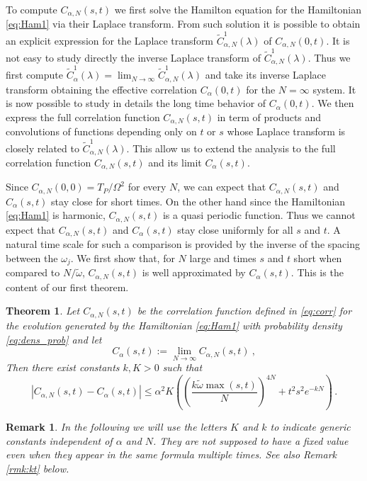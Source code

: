 \documentclass[11pt]{article}
\numberwithin{equation}{section}
\newtheorem{theo}{Theorem}
\newtheorem{rmk}[theorem]{Remark}
\numberwithin{theorem}{section}
\def\tilde#1{\widetilde{#1}}
\begin{document}
To compute $C_{\alpha,N}(s,t)$ we first solve the Hamilton equation for the Hamiltonian \eqref{eq:Ham1} via their
Laplace transform. From such solution it is possible to obtain an explicit expression for the Laplace transform $\tilde
C^1_{\alpha,N}(\lambda)$ of $C_{\alpha,N}(0,t)$. It is not easy to study directly the inverse Laplace transform of  $\tilde
C^1_{\alpha,N}(\lambda)$. Thus we first compute $\tilde C^1_{\alpha}(\lambda)=\lim_{N\to\infty}\tilde
C^1_{\alpha,N}(\lambda)$ and take its inverse Laplace transform obtaining the effective correlation $C_{\alpha}(0,t)$ for
the $N=\infty$ system. It is now possible to study in details the long time behavior of $C_{\alpha}(0,t)$.  We then
express the full correlation function $C_{\alpha,N}(s,t)$ in term of products and convolutions of functions depending
only on $t$ or $s$ whose Laplace transform is closely related to $\tilde C^1_{\alpha,N}(\lambda)$. This allow us to
extend the analysis to the full correlation function $C_{\alpha,N}(s,t)$ and its limit $C_{\alpha}(s,t)$.

Since $C_{\alpha,N}(0,0)=T_P/\Omega^2$ for every $N$, we can expect that $C_{\alpha,N}(s,t)$ and
$C_{\alpha}(s,t)$ stay close for short times. On the other hand since the Hamiltonian \eqref{eq:Ham1} is harmonic,
$C_{\alpha,N}(s,t)$ is a quasi periodic function. Thus we cannot expect that $C_{\alpha,N}(s,t)$ and $C_{\alpha}(s,t)$
stay close uniformly for all $s$ and $t$. A natural time scale for such a comparison is provided by the inverse of the
spacing between the $\omega_j$. We first show that, for $N$ large and  times $s$ and $t$ short when compared to
$N/\tilde \omega$, $C_{\alpha,N}(s,t)$ is well approximated by $C_\alpha(s,t)$. This is the content of our first
theorem.

\begin{theo}\label{th:appo}
Let $C_{\alpha,N}(s,t)$ be the correlation function defined in \eqref{eq:corr} for the evolution generated by the 
Hamiltonian \eqref{eq:Ham1} with probability density \eqref{eq:dens_prob} and let
\begin{equation}\label{eq:CNi}
 C_\alpha(s,t):=\lim_{N\to\infty} C_{\alpha,N}(s,t)\ ,
\end{equation}
Then there exist constants $k,K>0$ such that
\[
\left |C_{\alpha,N}(s,t)-C_\alpha(s,t)\right|\leq \alpha^2
K\left(\left(\frac{k\tilde\omega \max(s,t)}{N}\right)^{4N}+ t^2s^2e^{-kN}\right)\, .
\]
\end{theo}

\begin{rmk}\label{rmk:Aa}
\emph{In the following we will use the letters $K$ and $k$ to indicate generic constants independent of $\alpha$ and
$N$. They are not supposed to have a fixed value even when they appear in the same formula multiple times. See also
Remark \ref{rmk:kt} below.}
\end{rmk}
\end{document}
